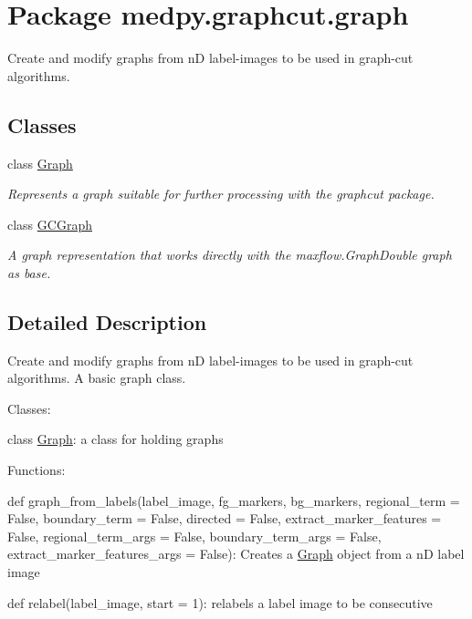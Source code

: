 \hypertarget{namespacemedpy_1_1graphcut_1_1graph}{
\section{Package medpy.graphcut.graph}
\label{namespacemedpy_1_1graphcut_1_1graph}
}


Create and modify graphs from nD label-\/images to be used in graph-\/cut algorithms.  


\subsection*{Classes}
\begin{DoxyCompactItemize}
\item 
class \hyperlink{classmedpy_1_1graphcut_1_1graph_1_1Graph}{Graph}
\begin{DoxyCompactList}\small\item\em Represents a graph suitable for further processing with the graphcut package. \end{DoxyCompactList}\item 
class \hyperlink{classmedpy_1_1graphcut_1_1graph_1_1GCGraph}{GCGraph}
\begin{DoxyCompactList}\small\item\em A graph representation that works directly with the maxflow.GraphDouble graph as base. \end{DoxyCompactList}\end{DoxyCompactItemize}


\subsection{Detailed Description}
Create and modify graphs from nD label-\/images to be used in graph-\/cut algorithms. A basic graph class.

Classes:
\begin{DoxyItemize}
\item class \hyperlink{classmedpy_1_1graphcut_1_1graph_1_1Graph}{Graph}: a class for holding graphs
\end{DoxyItemize}

Functions:
\begin{DoxyItemize}
\item def graph\_\-from\_\-labels(label\_\-image, fg\_\-markers, bg\_\-markers, regional\_\-term = False, boundary\_\-term = False, directed = False, extract\_\-marker\_\-features = False, regional\_\-term\_\-args = False, boundary\_\-term\_\-args = False, extract\_\-marker\_\-features\_\-args = False): Creates a \hyperlink{classmedpy_1_1graphcut_1_1graph_1_1Graph}{Graph} object from a nD label image
\item def relabel(label\_\-image, start = 1): relabels a label image to be consecutive
\end{DoxyItemize}

